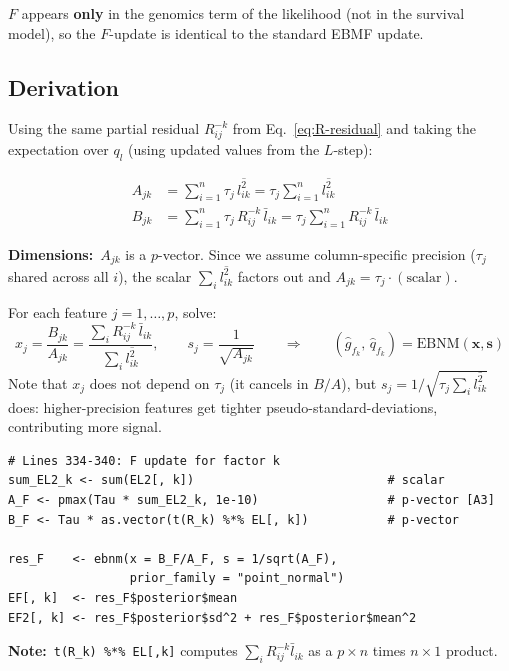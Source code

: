 \documentclass[11pt]{article}
\newcommand{\lbar}[2]{\bar{l}_{#1#2}}
\newcommand{\lsec}[2]{\overline{l^2_{#1#2}}}
\newcommand{\coderef}[1]{{\color{blue!70!black}\texttt{#1}}}
\begin{document}
$F$ appears \textbf{only} in the genomics term of the likelihood (not in the
survival model), so the $F$-update is identical to the standard EBMF update.

\subsection{Derivation}

Using the same partial residual $R^{-k}_{ij}$ from Eq.~\eqref{eq:R-residual}
and taking the expectation over $q_l$ (using updated values from the $L$-step):

\begin{align}
  A_{jk} &= \sum_{i=1}^n \tau_j\,\lsec{i}{k}
           = \tau_j \sum_{i=1}^n \lsec{i}{k}
  \label{eq:A-F} \\
  B_{jk} &= \sum_{i=1}^n \tau_j\,R^{-k}_{ij}\,\lbar{i}{k}
           = \tau_j \sum_{i=1}^n R^{-k}_{ij}\,\lbar{i}{k}
  \label{eq:B-F}
\end{align}

\textbf{Dimensions:}\ $A_{jk}$ is a $p$-vector.  Since we assume
column-specific precision ($\tau_j$ shared across all $i$), the scalar
$\sum_i \lsec{i}{k}$ factors out and $A_{jk} = \tau_j \cdot (\text{scalar})$.

\begin{ebnmbox}
For each feature $j = 1,\ldots,p$, solve:
\[
  x_j = \frac{B_{jk}}{A_{jk}}
       = \frac{\sum_i R^{-k}_{ij}\,\lbar{i}{k}}
              {\sum_i \lsec{i}{k}},
  \qquad
  s_j = \frac{1}{\sqrt{A_{jk}}}
  \qquad \Longrightarrow \qquad
  (\hat{g}_{f_k},\, \hat{q}_{f_k}) = \mathrm{EBNM}(\mathbf{x}, \mathbf{s})
\]
Note that $x_j$ does not depend on $\tau_j$ (it cancels in $B/A$), but
$s_j = 1/\sqrt{\tau_j \sum_i \lsec{i}{k}}$ does: higher-precision features
get tighter pseudo-standard-deviations, contributing more signal.
\end{ebnmbox}

\begin{codebox}
\begin{lstlisting}[style=Rstyle]
# Lines 334-340: F update for factor k
sum_EL2_k <- sum(EL2[, k])                           # scalar
A_F <- pmax(Tau * sum_EL2_k, 1e-10)                  # p-vector [A3]
B_F <- Tau * as.vector(t(R_k) %*% EL[, k])           # p-vector

res_F    <- ebnm(x = B_F/A_F, s = 1/sqrt(A_F),
                 prior_family = "point_normal")
EF[, k]  <- res_F$posterior$mean
EF2[, k] <- res_F$posterior$sd^2 + res_F$posterior$mean^2
\end{lstlisting}
\textbf{Note:}\ \coderef{t(R\_k) \%*\% EL[,k]} computes
$\sum_i R^{-k}_{ij} \lbar{i}{k}$ as a $p\times n$ times $n\times 1$ product.
\end{codebox}
\end{document}
